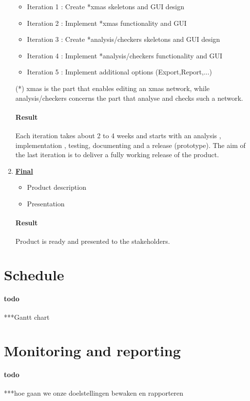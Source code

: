 \documentclass[a4paper,11pt,twoside,draft]{article}
\begin{document}
\begin{enumerate}
	\begin{itemize}
		\item Iteration 1 :
			Create *xmas skeletons and GUI design
		\item Iteration 2 :
			Implement *xmas functionality and GUI
		\item Iteration 3 :
			Create *analysis/checkers skeletons and GUI design
		\item Iteration 4 :
			Implement *analysis/checkers functionality and GUI
		\item Iteration 5 :
			Implement additional options (Export,Report,...)
	\end{itemize}
	(*) xmas is the part that enables editing an xmas network, while analysis/checkers concerns the part that analyse and checks such a network.
	
	\paragraph{Result}
	Each iteration takes about 2 to 4 weeks and starts with an analysis , implementation , testing, documenting and a release (prototype). The aim of the last iteration is to deliver a fully working release of the product.
	
	\item \underline{\textbf{Final}}
	\begin{itemize}
		\item Product description
		\item Presentation
	\end{itemize}
	\paragraph{Result}
	Product is ready and presented to the stakeholders.
\end{enumerate}
\section{Schedule}
\paragraph{todo}
***Gantt chart
\section{Monitoring and reporting}
\paragraph{todo}
***hoe gaan we onze doelstellingen bewaken en rapporteren
\end{document}
